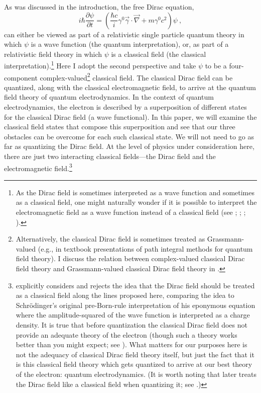 \documentclass[12pt,secnumarabic,amsmath,amssymb,balancelastpage,nofootinbib]{article}
\begin{document}
As was discussed in the introduction, the free Dirac equation,
\begin{equation}
i\hbar \frac{\partial \psi}{\partial t}=\left(\frac{\hbar c}{i}\gamma^0 \vec{\gamma}\cdot\vec{\nabla}+m\gamma^0 c^2\right)\psi
\ ,
\label{thediracequation}
\end{equation}
can either be viewed as part of a relativistic single particle quantum theory in which $\psi$ is a wave function (the quantum interpretation), or, as part of a relativistic field theory in which $\psi$ is a classical field (the classical interpretation).\footnote{As the Dirac field is sometimes interpreted as a wave function and sometimes as a classical field, one might naturally wonder if it is possible to interpret the electromagnetic field as a wave function instead of a classical field  (see \citealp{good1957}; \citealp{mignani1974}; \citealp{bialynicki1996}; \citealp{emasqp}).}  Here I adopt the second perspective and take $\psi$ to be a four-component complex-valued\footnote{Alternatively, the classical Dirac field is sometimes treated as Grassmann-valued (e.g., in textbook presentations of path integral methods for quantum field theory).  I discuss the relation between complex-valued classical Dirac field theory and Grassmann-valued classical Dirac field theory in \citet{positronpaper}.} classical field.  The classical Dirac field can be quantized, along with the classical electromagnetic field, to arrive at the quantum field theory of quantum electrodynamics.  In the context of quantum electrodynamics, the electron is described by a superposition of different states for the classical Dirac field (a wave functional).  In this paper, we will examine the classical field states that compose this superposition and see that our three obstacles can be overcome for each such classical state.  We will not need to go as far as quantizing the Dirac field.  At the level of physics under consideration here, there are just two interacting classical fields---the Dirac field and the electromagnetic field.\footnote{\citet[pg.\ 216--217]{weyl} explicitly considers and rejects the idea that the Dirac field should be treated as a classical field along the lines proposed here, comparing the idea to Schr\"{o}dinger's original pre-Born-rule interpretation of his eponymous equation where the amplitude-squared of the wave function is interpreted as a charge density.  It is true that before quantization the classical Dirac field does not provide an adequate theory of the electron (though such a theory works better than you might expect; see \citealp{crisp1969,jaynes1973,barut1988, barut1990}).  What matters for our purposes here is not the adequacy of classical Dirac field theory itself, but just the fact that it is this classical field theory which gets quantized to arrive at our best theory of the electron: quantum electrodynamics.  (It is worth noting that \citealp{weyl} later treats the Dirac field like a classical field when quantizing it; see \citealp[pg.\ 451]{pashby2012}.)}
\end{document}
